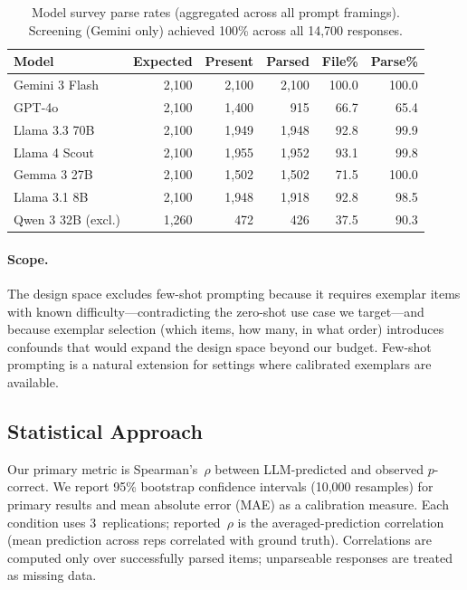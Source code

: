 \documentclass[runningheads]{llncs}
\begin{document}
\begin{table}[t]
\centering
\caption{Model survey parse rates (aggregated across all prompt framings). Screening (Gemini only) achieved 100\% across all 14,700 responses.}\label{tab:parse-rates}
\small
\begin{tabular}{@{}lrrrrr@{}}
\toprule
Model & Expected & Present & Parsed & File\% & Parse\% \\
\midrule
Gemini 3 Flash      & 2{,}100 & 2{,}100 & 2{,}100 & 100.0 & 100.0 \\
GPT-4o              & 2{,}100 & 1{,}400 &    915  &  66.7 &  65.4 \\
Llama 3.3 70B       & 2{,}100 & 1{,}949 & 1{,}948 &  92.8 &  99.9 \\
Llama 4 Scout       & 2{,}100 & 1{,}955 & 1{,}952 &  93.1 &  99.8 \\
Gemma 3 27B         & 2{,}100 & 1{,}502 & 1{,}502 &  71.5 & 100.0 \\
Llama 3.1 8B        & 2{,}100 & 1{,}948 & 1{,}918 &  92.8 &  98.5 \\
Qwen 3 32B (excl.)  & 1{,}260 &    472  &    426  &  37.5 &  90.3 \\
\bottomrule
\end{tabular}
\end{table}

\paragraph{Scope.}
The design space excludes few-shot prompting because it requires exemplar items with known difficulty---contradicting the zero-shot use case we target---and because exemplar selection (which items, how many, in what order) introduces confounds that would expand the design space beyond our budget. Few-shot prompting is a natural extension for settings where calibrated exemplars are available.

\subsection{Statistical Approach}

Our primary metric is Spearman's~$\rho$ between LLM-predicted and observed $p$-correct. We report 95\% bootstrap confidence intervals (10,000 resamples) for primary results and mean absolute error (MAE) as a calibration measure. Each condition uses 3~replications; reported~$\rho$ is the averaged-prediction correlation (mean prediction across reps correlated with ground truth). Correlations are computed only over successfully parsed items; unparseable responses are treated as missing data.
\end{document}
